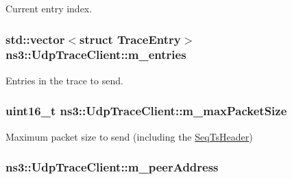 Current entry index. 

\subsubsection[{\texorpdfstring{m\+\_\+entries}{m_entries}}]{\setlength{\rightskip}{0pt plus 5cm}std\+::vector$<$struct {\bf Trace\+Entry}$>$ ns3\+::\+Udp\+Trace\+Client\+::m\+\_\+entries\hspace{0.3cm}{\ttfamily [private]}}\hypertarget{structns3_1_1UdpTraceClient_a70572bdca03573bfb7fe51552f2ea28a}{}\label{structns3_1_1UdpTraceClient_a70572bdca03573bfb7fe51552f2ea28a}


Entries in the trace to send. 

\subsubsection[{\texorpdfstring{m\+\_\+max\+Packet\+Size}{m_maxPacketSize}}]{\setlength{\rightskip}{0pt plus 5cm}uint16\+\_\+t ns3\+::\+Udp\+Trace\+Client\+::m\+\_\+max\+Packet\+Size\hspace{0.3cm}{\ttfamily [private]}}\hypertarget{structns3_1_1UdpTraceClient_aa5ba9f3cd73ca417df59d14bb18e16a1}{}\label{structns3_1_1UdpTraceClient_aa5ba9f3cd73ca417df59d14bb18e16a1}


Maximum packet size to send (including the \hyperlink{classns3_1_1SeqTsHeader}{Seq\+Ts\+Header}) 

\subsubsection[{\texorpdfstring{m\+\_\+peer\+Address}{m_peerAddress}}]{ ns3\+::\+Udp\+Trace\+Client\+::m\+\_\+peer\+Address\hspace{0.3cm}{\ttfamily [private]}}\hypertarget{structns3_1_1UdpTraceClient_a23963b5603afc628e516eb1eccb14ad8}{}\label{structns3_1_1UdpTraceClient_a23963b5603afc628e516eb1eccb14ad8}


